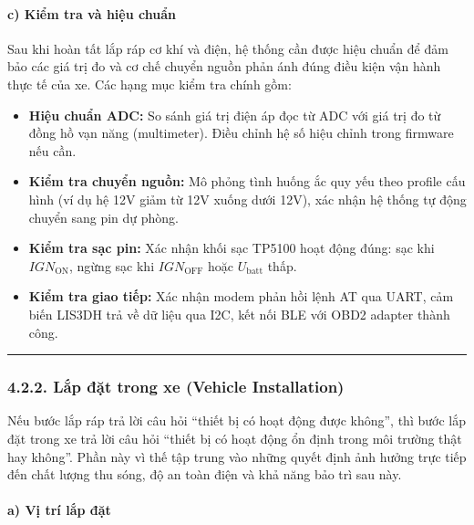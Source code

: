 \documentclass[a4paper]{extarticle}
\providecommand{\tightlist}{%
  \setlength{\itemsep}{0pt}\setlength{\parskip}{0pt}}
\begin{document}
\paragraph{c) Kiểm tra và hiệu
chuẩn}\label{c-kiux1ec3m-tra-vuxe0-hiux1ec7u-chuux1ea9n}

Sau khi hoàn tất lắp ráp cơ khí và điện, hệ thống cần được hiệu chuẩn để
đảm bảo các giá trị đo và cơ chế chuyển nguồn phản ánh đúng điều kiện
vận hành thực tế của xe. Các hạng mục kiểm tra chính gồm:

\begin{itemize}
\tightlist
\item
  \textbf{Hiệu chuẩn ADC:} So sánh giá trị điện áp đọc từ ADC với giá
  trị đo từ đồng hồ vạn năng (multimeter). Điều chỉnh hệ số hiệu chỉnh
  trong firmware nếu cần.
\item
  \textbf{Kiểm tra chuyển nguồn:} Mô phỏng tình huống ắc quy yếu theo
  profile cấu hình (ví dụ hệ 12V giảm từ 12V xuống dưới 12V), xác nhận
  hệ thống tự động chuyển sang pin dự phòng.
\item
  \textbf{Kiểm tra sạc pin:} Xác nhận khối sạc TP5100 hoạt động đúng: sạc
  khi \(IGN_{\mathrm{ON}}\), ngừng sạc khi \(IGN_{\mathrm{OFF}}\) hoặc
  \(U_{\text{batt}}\) thấp.
\item
  \textbf{Kiểm tra giao tiếp:} Xác nhận modem phản hồi lệnh AT qua UART,
  cảm biến LIS3DH trả về dữ liệu qua I2C, kết nối BLE với OBD2 adapter
  thành công.
\end{itemize}

\begin{center}\rule{0.5\linewidth}{0.5pt}\end{center}

\subsubsection{4.2.2. Lắp đặt trong xe (Vehicle
Installation)}\label{422-lux1eafp-ux111ux1eb7t-trong-xe-vehicle-installation}

Nếu bước lắp ráp trả lời câu hỏi ``thiết bị có hoạt động được không'',
thì bước lắp đặt trong xe trả lời câu hỏi ``thiết bị có hoạt động ổn
định trong môi trường thật hay không''. Phần này vì thế tập trung vào
những quyết định ảnh hưởng trực tiếp đến chất lượng thu sóng, độ an toàn
điện và khả năng bảo trì sau này.

\paragraph{a) Vị trí lắp
đặt}\label{a-vux1ecb-truxed-lux1eafp-ux111ux1eb7t}
\end{document}

